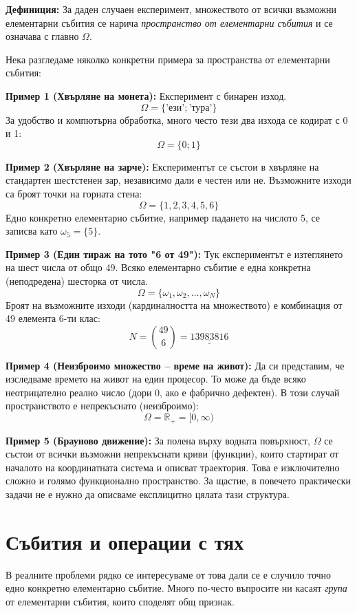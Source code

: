 \documentclass{article}
\begin{document}
\textbf{Дефиниция:} За даден случаен експеримент, множеството от всички възможни елементарни събития се нарича \emph{пространство от елементарни събития} и се означава с главно $\Omega$.

Нека разгледаме няколко конкретни примера за пространства от елементарни събития:

\textbf{Пример 1 (Хвърляне на монета):} 
Експеримент с бинарен изход.
\[
\Omega = \{ \text{'ези'}; \text{'тура'} \}
\]
За удобство и компютърна обработка, много често тези два изхода се кодират с 0 и 1:
\[
\Omega = \{ 0; 1 \}
\]

\textbf{Пример 2 (Хвърляне на зарче):} 
Експериментът се състои в хвърляне на стандартен шестстенен зар, независимо дали е честен или не. Възможните изходи са броят точки на горната стена:
\[
\Omega = \{ 1, 2, 3, 4, 5, 6 \}
\]
Едно конкретно елементарно събитие, например падането на числото 5, се записва като $\omega_5 = \{ 5 \}$.

\textbf{Пример 3 (Един тираж на тото "6 от 49"):} 
Тук експериментът е изтеглянето на шест числа от общо 49. Всяко елементарно събитие е една конкретна (неподредена) шесторка от числа.
\[
\Omega = \{ \omega_1, \omega_2, \dots, \omega_N \}
\]
Броят на възможните изходи (кардиналността на множеството) е комбинация от 49 елемента 6-ти клас:
\[
N = \binom{49}{6} = \underline{\underline{13983816}}
\]

\textbf{Пример 4 (Неизброимо множество – време на живот):} 
Да си представим, че изследваме времето на живот на един процесор. То може да бъде всяко неотрицателно реално число (дори 0, ако е фабрично дефектен). В този случай пространството е непрекъснато (неизброимо):
\[
\Omega = \mathbb{R}_+ = [0, \infty)
\]

\textbf{Пример 5 (Брауново движение):} 
За полена върху водната повърхност, $\Omega$ се състои от всички възможни непрекъснати криви (функции), които стартират от началото на координатната система и описват траектория. Това е изключително сложно и голямо функционално пространство. За щастие, в повечето практически задачи не е нужно да описваме експлицитно цялата тази структура.

\section{Събития и операции с тях}

В реалните проблеми рядко се интересуваме от това дали се е случило точно едно конкретно елементарно събитие. Много по-често въпросите ни касаят \emph{група} от елементарни събития, които споделят общ признак.
\end{document}
